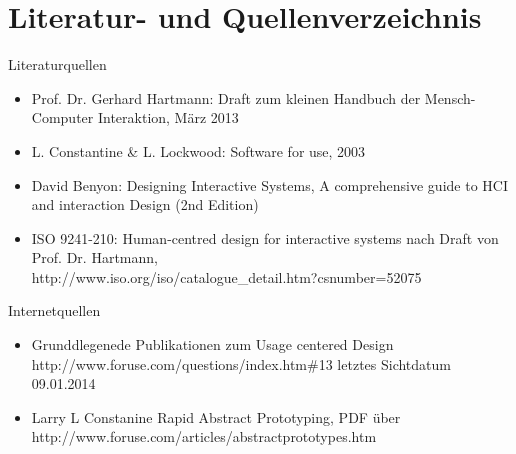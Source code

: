 
\chapter*{Literatur- und Quellenverzeichnis}
Literaturquellen 
\begin{itemize}
\item
Prof. Dr. Gerhard Hartmann: Draft zum kleinen Handbuch der Mensch-Computer Interaktion, März 2013
\item
L. Constantine \& L. Lockwood: Software for use, 2003
\item 
David Benyon: Designing Interactive Systems, A comprehensive guide to HCI and interaction Design (2nd Edition) 
\item
ISO 9241-210: Human-centred design for interactive systems nach Draft von Prof. Dr. Hartmann,
\\http://www.iso.org/iso/catalogue\_detail.htm?csnumber=52075

\end{itemize}

Internetquellen 
\begin{itemize}
\item
Grunddlegenede Publikationen zum Usage centered Design \\http://www.foruse.com/questions/index.htm\#13 letztes Sichtdatum 09.01.2014

\item
Larry L Constanine Rapid Abstract Prototyping, PDF über \\ http://www.foruse.com/articles/abstractprototypes.htm

\end{itemize}

\newpage
